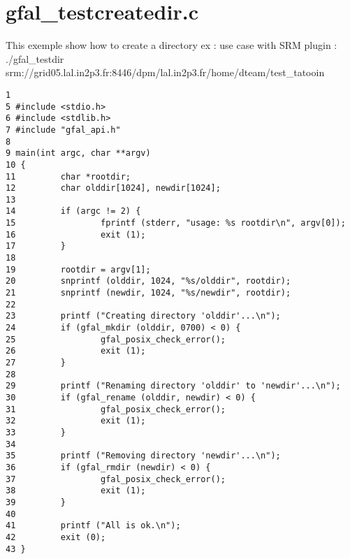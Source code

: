 \section{gfal\_\-testcreatedir.c}
This exemple show how to create a directory ex : use case with SRM plugin : ./gfal\_\-testdir srm://grid05.lal.in2p3.fr:8446/dpm/lal.in2p3.fr/home/dteam/test\_\-tatooin



\begin{DocInclude}\begin{verbatim}1 
5 #include <stdio.h>
6 #include <stdlib.h>
7 #include "gfal_api.h"
8 
9 main(int argc, char **argv)
10 {
11         char *rootdir;
12         char olddir[1024], newdir[1024];
13 
14         if (argc != 2) {
15                 fprintf (stderr, "usage: %s rootdir\n", argv[0]);
16                 exit (1);
17         }
18 
19         rootdir = argv[1];
20         snprintf (olddir, 1024, "%s/olddir", rootdir);
21         snprintf (newdir, 1024, "%s/newdir", rootdir);
22 
23         printf ("Creating directory 'olddir'...\n");
24         if (gfal_mkdir (olddir, 0700) < 0) {
25                 gfal_posix_check_error();
26                 exit (1);
27         }
28 
29         printf ("Renaming directory 'olddir' to 'newdir'...\n");
30         if (gfal_rename (olddir, newdir) < 0) {
31                 gfal_posix_check_error();
32                 exit (1);
33         }
34 
35         printf ("Removing directory 'newdir'...\n");
36         if (gfal_rmdir (newdir) < 0) {
37                 gfal_posix_check_error();
38                 exit (1);
39         }
40 
41         printf ("All is ok.\n");
42         exit (0);
43 }
\end{verbatim}
\end{DocInclude}
 